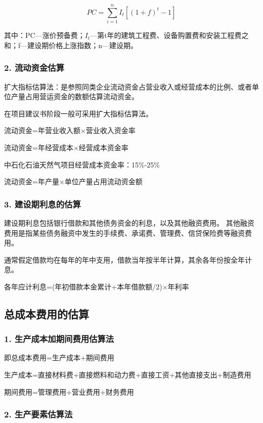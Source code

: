 $$PC=\sum_{i=1}^{n}I_t[(1+f)^t-1]$$

其中：PC—涨价预备费；$I_t$—第t年的建筑工程费、设备购置费和安装工程费之和；f—建设期价格上涨指数；n—建设期。

\subsubsection{2. 流动资金估算}

扩大指标估算法：是参照同类企业流动资金占营业收入或经营成本的比例、或者单位产量占用营运资金的数额估算流动资金。

在项目建议书阶段一般可采用扩大指标估算法。

流动资金=年营业收入额×营业收入资金率

流动资金=年经营成本×经营成本资金率

中石化石油天然气项目经营成本资金率：15\%-25\%

流动资金=年产量×单位产量占用流动资金额

\subsubsection{3. 建设期利息的估算}

建设期利息包括银行借款和其他债务资金的利息，以及其他融资费用。
其他融资费用是指某些债务融资中发生的手续费、承诺费、管理费、信贷保险费等融资费用。

通常假定借款均在每年的年中支用，借款当年按半年计算，其余各年份按全年计息。

各年应计利息=(年初借款本金累计+本年借款额/2)$\times $年利率

\subsection{总成本费用的估算}

\subsubsection{1. 生产成本加期间费用估算法}

即总成本费用=生产成本+期间费用

生产成本=直接材料费+直接燃料和动力费+直接工资+其他直接支出+制造费用

期间费用=管理费用+营业费用+财务费用

\subsubsection{2. 生产要素估算法}

